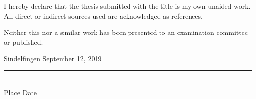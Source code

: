 I hereby declare that the thesis submitted with the title \textit{\@title} is my own unaided work. All direct or indirect sources used are acknowledged as references.

Neither this nor a similar work has been presented to an examination committee or published.

\vspace{4em}

Sindelfingen
\hspace{1.3cm}
September 12, 2019
\vspace{-0.4cm}
\\
\rule{15cm}{0.4pt}\\
Place
\hspace{2.5cm}
Date
\hspace{4.5cm}
\@author